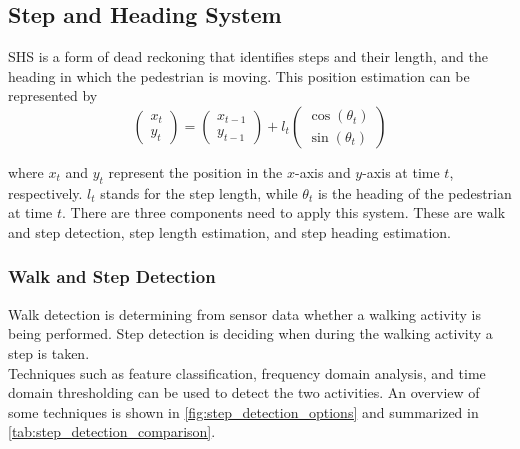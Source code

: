 \subsection{Step and Heading System}
\label{sec:rw-SHS}
\ac{SHS} is a form of dead reckoning that identifies steps and their length, and the heading in which the pedestrian is moving. This position estimation can be represented by \cite{MunozDiaz2019}
\begin{equation}
	\label{eq:SHS_dynamic_model}
	\left(\begin{array}{l}
		x_t \\
		y_t
	\end{array}\right) 
	=
	\left(\begin{array}{l}
		x_{t-1} \\
		y_{t-1}
	\end{array}\right) 
	+l_{t} \left(\begin{array}{l}
		\cos \left(\theta_{t}\right) \\
		\sin \left(\theta_{t}\right)
	\end{array}\right)
\end{equation}

where $x_{t}$  and  $y_{t}$ represent the position in the $x$-axis and $y$-axis at time  $t$, respectively. $l_{t}$ stands for the step length, while $\theta_{t}$ is the heading of the pedestrian at time $t$.
There are three components need to apply this system. These are walk and step detection, step length estimation, and step heading estimation.


\subsubsection{Walk and Step Detection}
\label{sec:rw - step detection}
Walk detection is determining from sensor data whether a walking activity is being performed. Step detection is deciding when during the walking activity a step is taken. \\
Techniques such as feature classification, frequency domain analysis, and time domain thresholding can be used to detect the two activities. An overview of some techniques  is  shown in \cref{fig:step_detection_options} and summarized in \cref{tab:step_detection_comparison}. %

